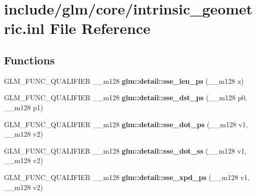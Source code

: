\hypertarget{intrinsic__geometric_8inl}{\section{include/glm/core/intrinsic\-\_\-geometric.inl \-File \-Reference}
\label{intrinsic__geometric_8inl}
}
\subsection*{\-Functions}
\begin{DoxyCompactItemize}
\item 
\hypertarget{namespaceglm_1_1detail_aa49baf7bcbe9eb783a85bcd3ce8d8dba}{\-G\-L\-M\-\_\-\-F\-U\-N\-C\-\_\-\-Q\-U\-A\-L\-I\-F\-I\-E\-R \-\_\-\-\_\-m128 {\bfseries glm\-::detail\-::sse\-\_\-len\-\_\-ps} (\-\_\-\-\_\-m128 x)}\label{namespaceglm_1_1detail_aa49baf7bcbe9eb783a85bcd3ce8d8dba}

\item 
\hypertarget{namespaceglm_1_1detail_a9d4832acb69aa3f67d6e06c64b29dddd}{\-G\-L\-M\-\_\-\-F\-U\-N\-C\-\_\-\-Q\-U\-A\-L\-I\-F\-I\-E\-R \-\_\-\-\_\-m128 {\bfseries glm\-::detail\-::sse\-\_\-dst\-\_\-ps} (\-\_\-\-\_\-m128 p0, \-\_\-\-\_\-m128 p1)}\label{namespaceglm_1_1detail_a9d4832acb69aa3f67d6e06c64b29dddd}

\item 
\hypertarget{namespaceglm_1_1detail_ad4dfd210b559dcff4cbc4a674477b90b}{\-G\-L\-M\-\_\-\-F\-U\-N\-C\-\_\-\-Q\-U\-A\-L\-I\-F\-I\-E\-R \-\_\-\-\_\-m128 {\bfseries glm\-::detail\-::sse\-\_\-dot\-\_\-ps} (\-\_\-\-\_\-m128 v1, \-\_\-\-\_\-m128 v2)}\label{namespaceglm_1_1detail_ad4dfd210b559dcff4cbc4a674477b90b}

\item 
\hypertarget{namespaceglm_1_1detail_a794070b64c8a2bd03e393c79be9ed17e}{\-G\-L\-M\-\_\-\-F\-U\-N\-C\-\_\-\-Q\-U\-A\-L\-I\-F\-I\-E\-R \-\_\-\-\_\-m128 {\bfseries glm\-::detail\-::sse\-\_\-dot\-\_\-ss} (\-\_\-\-\_\-m128 v1, \-\_\-\-\_\-m128 v2)}\label{namespaceglm_1_1detail_a794070b64c8a2bd03e393c79be9ed17e}

\item 
\hypertarget{namespaceglm_1_1detail_a0692599f2cf8b5a9fd64ccf7023805c7}{\-G\-L\-M\-\_\-\-F\-U\-N\-C\-\_\-\-Q\-U\-A\-L\-I\-F\-I\-E\-R \-\_\-\-\_\-m128 {\bfseries glm\-::detail\-::sse\-\_\-xpd\-\_\-ps} (\-\_\-\-\_\-m128 v1, \-\_\-\-\_\-m128 v2)}\label{namespaceglm_1_1detail_a0692599f2cf8b5a9fd64ccf7023805c7}


\end{DoxyCompactItemize}
